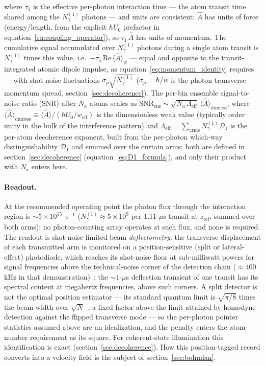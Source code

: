 \documentclass[11pt,a4paper]{article}
\begin{document}
where $\tau_1$ is the effective per-photon interaction time --- the atom transit time shared among the $N_\gamma^{(1)}$ photons --- and units are consistent: $\hat{A}$ has units of force (energy/length, from the explicit $\hbar U_0$ prefactor in equation~\eqref{eq:coupling_operator}), so $\tau_1\,\hat{A}$ has units of momentum. The cumulative signal accumulated over $N_\gamma^{(1)}$ photons during a single atom transit is $N_\gamma^{(1)}$ times this value, i.e.\ $-\tau_a\,\mathrm{Re}\,\langle\hat{A}\rangle_w$ --- equal and opposite to the transit-integrated atomic dipole impulse, as equation~\eqref{eq:momentum_identity} requires --- with shot-noise fluctuations $\sigma_p\sqrt{N_\gamma^{(1)}}$ ($\sigma_p = \hbar/w$ is the photon transverse momentum spread, section~\ref{sec:decoherence}). The per-bin ensemble signal-to-noise ratio (SNR) after $N_a$ atoms scales as $\mathrm{SNR}_\text{ens} \sim \sqrt{N_a\,\Lambda_\text{eff}}\,\langle\hat{A}\rangle_\text{dimless}$, where $\langle\hat{A}\rangle_\text{dimless} \equiv \langle\hat{A}\rangle/(\hbar U_0/w_\text{eff})$ is the dimensionless weak value (typically order unity in the bulk of the interference pattern) and $\Lambda_\text{eff} = \sum_\text{arms} N_\gamma^{(1)}\mathcal{D}_1$ is the per-atom decoherence exponent, built from the per-photon which-way distinguishability $\mathcal{D}_1$ and summed over the curtain arms; both are defined in section~\ref{sec:decoherence} (equation~\eqref{eq:D1_formula}), and only their product with $N_a$ enters here.

\paragraph{Readout.} At the recommended operating point the photon flux through the interaction region is $\sim 5\times 10^{15}$~s$^{-1}$ ($N_\gamma^{(1)} \approx 5\times 10^9$ per 1.11-$\mu$s transit at $z_\text{ref}$, summed over both arms); no photon-counting array operates at such flux, and none is required. The readout is shot-noise-limited beam \emph{deflectometry}: the transverse displacement of each transmitted arm is monitored on a position-sensitive (split or lateral-effect) photodiode, which reaches its shot-noise floor at sub-milliwatt powers for signal frequencies above the technical-noise corner of the detection chain ($\approx 400$ kHz in that demonstration)~\cite{Pooser2015}; the $\sim 1$-$\mu$s deflection transient of one transit has its spectral content at megahertz frequencies, above such corners. A split detector is not the optimal position estimator --- its standard quantum limit is $\sqrt{\pi/8}$ times the beam width over $\sqrt{N}$~\cite{Treps2002}, a fixed factor above the limit attained by homodyne detection against the flipped transverse mode --- so the per-photon pointer statistics assumed above are an idealization, and the penalty enters the atom-number requirement as its square. For coherent-state illumination this identification is exact (section~\ref{sec:decoherence}). How this position-tagged record converts into a velocity field is the subject of section~\ref{sec:bohmian}.
\end{document}
